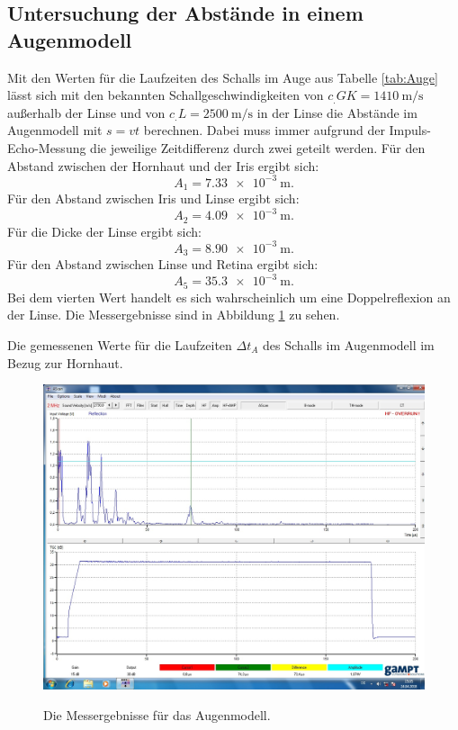 \subsection{Untersuchung der Abstände in einem Augenmodell}

\noindent Mit den Werten für die Laufzeiten des Schalls im Auge aus Tabelle \ref{tab:Auge} lässt sich mit den bekannten Schallgeschwindigkeiten von $c_.{GK}=\SI{1410}{\meter\per\second}$ \cite{US1} außerhalb der Linse und von $c_.{L}=\SI{2500}{\meter\per\second}$ \cite{US1} in der Linse die Abstände im Augenmodell mit $s=vt$ berechnen. Dabei muss immer aufgrund der Impuls-Echo-Messung die jeweilige Zeitdifferenz durch zwei geteilt werden. Für den Abstand zwischen der Hornhaut und der Iris ergibt sich:
\begin{equation*}
A_1=\SI{7.33e-3}{\meter}\text{.}
\end{equation*}
Für den Abstand zwischen Iris und Linse ergibt sich:
\begin{equation*}
A_2=\SI{4.09e-3}{\meter}\text{.}
\end{equation*}
Für die Dicke der Linse ergibt sich:
\begin{equation*}
A_3=\SI{8.90e-3}{\meter}\text{.}
\end{equation*}
Für den Abstand zwischen Linse und Retina ergibt sich:
\begin{equation*}
A_5=\SI{35,3e-3}{\meter}\text{.}
\end{equation*}
Bei dem vierten Wert handelt es sich wahrscheinlich um eine Doppelreflexion an der Linse.
Die Messergebnisse sind in Abbildung \ref{fig:Auge} zu sehen.

\begin{table}
	\centering
	\caption{Die gemessenen Werte für die Laufzeiten $\Delta t_A$ des Schalls im Augenmodell im Bezug zur Hornhaut.}
	
	\label{tab:Auge}
\end{table}

\begin{figure}
	\centering
	\caption{Die Messergebnisse für das Augenmodell.}
	\includegraphics[width=\linewidth-70pt,height=\textheight-70pt,keepaspectratio]{content/images/AUGE.jpg}
	\label{fig:Auge}
\end{figure}